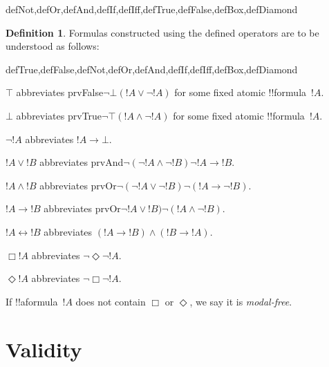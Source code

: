 \documentclass[10pt,a4paper]{article}
\theoremstyle{plain}
\theoremstyle{definition}
\newtheorem{defn}[thm]{Definition}
\theoremstyle{remark}
\newcommand*{\olfileid}[3]{}
\newcommand*{\olsection}[1]{\section*{#1}}
\providecommand{\lif}{\mathbin{\rightarrow}}
\providecommand{\ltrue}{\top}
\providecommand{\lfalse}{\bot}
\providecommand{\iftag}[1]{#1}
\providecommand{\tagitem}[1]{\item[#1]}
\providecommand{\liff}{\mathbin{\leftrightarrow}}
\providecommand{\iftag}{}
\begin{document}
\begin{tagblock}{defNot,defOr,defAnd,defIf,defIff,defTrue,defFalse,defBox,defDiamond}
\begin{defn}
Formulas constructed using the defined operators are to be understood
as follows:

\begin{tagenumerate}{defTrue,defFalse,defNot,defOr,defAnd,defIf,defIff,defBox,defDiamond}

\tagitem{defTrue}{$\ltrue$ abbreviates
  \iftag{prvFalse}{$\lnot\lfalse$}{$(!A \lor \lnot !A)$ for some
    fixed atomic !!{formula}~$!A$}.}{}

\tagitem{defFalse}{$\lfalse$ abbreviates
  \iftag{prvTrue}{$\lnot\ltrue$}{$(!A \land \lnot !A)$ for some
    fixed atomic !!{formula}~$!A$}.}{}

\tagitem{defNot}{$\lnot !A$ abbreviates $!A \lif \lfalse$.}{}

\tagitem{defOr}{$!A \lor !B$ abbreviates
  \iftag{prvAnd}{$\lnot(\lnot !A \land \lnot !B)$}{$\lnot !A \lif
    !B$}.}{}

\tagitem{defAnd}{$!A \land !B$ abbreviates
  \iftag{prvOr}{$\lnot(\lnot !A \lor \lnot !B)$}{$\lnot (!A \lif
    \lnot !B)$}.}{}

\tagitem{defIf}{$!A \lif !B$ abbreviates
  \iftag{prvOr}{$\lnot !A \lor !B)$}{$\lnot (!A \land \lnot !B)$}.}{}

\tagitem{defIff}{$!A \liff !B$ abbreviates $(!A \lif !B) \land (!B
  \lif !A)$.}{}

\tagitem{defBox}{$\Box !A$ abbreviates $\lnot\Diamond\lnot !A$. }{}

\tagitem{defDiamond}{$\Diamond !A$ abbreviates $\lnot\Box\lnot !A$.}{}
\end{tagenumerate}
\end{defn}
\end{tagblock}

If !!a{formula}~$!A$ does not contain $\Box$ or $\Diamond$, we say it
is \emph{modal-free}.





\olfileid{nml}{syn}{val}

\olsection{Validity}
\end{document}
